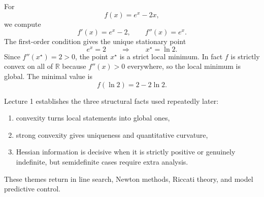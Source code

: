 \begin{eg}
	For
	\[
		f(x)=e^x-2x,
	\]
	we compute
	\[
		f'(x)=e^x-2,
		\qquad
		f''(x)=e^x.
	\]
	The first-order condition gives the unique stationary point
	\[
		e^x=2
		\qquad \Longrightarrow \qquad
		x^\star=\ln 2.
	\]
	Since $f''(x^\star)=2>0$, the point $x^\star$ is a strict local minimum. In fact $f$ is strictly convex on all of $\mathbb{R}$ because $f''(x)>0$ everywhere, so the local minimum is global. The minimal value is
	\[
		f(\ln 2)=2-2\ln 2.
	\]
\end{eg}

\begin{remark}
	Lecture 1 establishes the three structural facts used repeatedly later:
	\begin{enumerate}[label=(\roman*)]
		\item convexity turns local statements into global ones,
		\item strong convexity gives uniqueness and quantitative curvature,
		\item Hessian information is decisive when it is strictly positive or genuinely indefinite, but semidefinite cases require extra analysis.
	\end{enumerate}
	These themes return in line search, Newton methods, Riccati theory, and model predictive control.
\end{remark}
